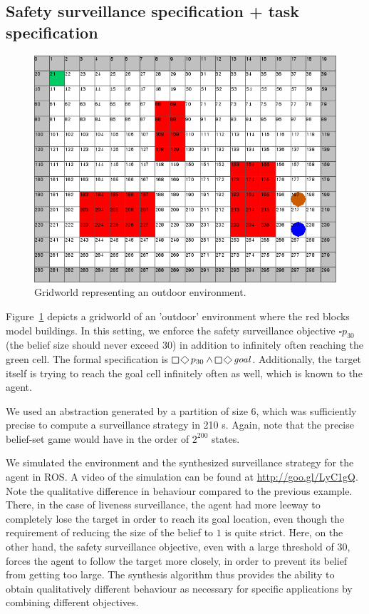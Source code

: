 \subsection{Safety surveillance specification + task specification}
\begin{figure}
\centering
\includegraphics[scale=0.2]{case2.png}\caption{Gridworld representing an outdoor environment.}\label{fig:case2}
\vspace{-.5cm}
\end{figure}
Figure~\ref{fig:case2} depicts a gridworld of an 'outdoor' environment where the red blocks model buildings. 
In this setting, we enforce the safety surveillance objective $\square p_{30}$ (the belief size should never exceed 30) in addition to infinitely often reaching the green cell. The formal specification is $\LTLglobally\LTLfinally p_{30} \wedge \LTLglobally\LTLfinally \mathit{goal}$. Additionally, the target itself is trying to reach the goal cell infinitely often as well, which is known to the agent.

We used an abstraction generated by a partition of size 6, which was sufficiently precise to compute a surveillance strategy in 210 s. Again, note that the precise belief-set game would have in the order of $2^{200}$ states.
 
We simulated the environment and the synthesized surveillance strategy for the agent in ROS. A video of the simulation can be found at \url{http://goo.gl/LyC1gQ}. Note the qualitative difference in behaviour compared to the previous example. There, in the case of liveness surveillance, the agent had more leeway to completely lose the target in order to reach its goal location, even though the requirement of reducing the size of the belief to $1$ is quite strict. Here, on the other hand, the safety surveillance objective, even with a large threshold of $30$, forces the agent to follow the target more closely, in order to prevent its belief from getting too large. The synthesis algorithm thus provides the ability to obtain qualitatively different behaviour as necessary for specific applications by combining different objectives. 

